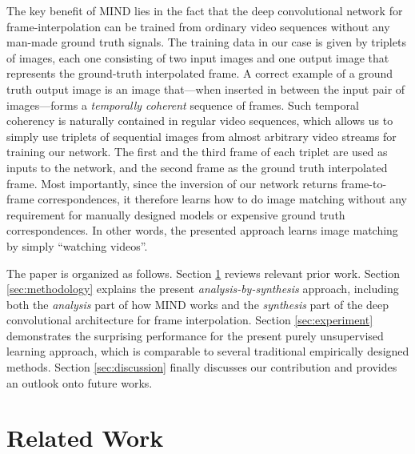 \documentclass[runningheads]{llncs}
\begin{document}
  The key benefit of MIND lies in the fact that the deep convolutional network for frame-interpolation can be trained from ordinary video sequences without any man-made ground truth signals. The training data in our case is given by triplets of images, each one consisting of two input images and one output image that represents the ground-truth interpolated frame. A correct example of a ground truth output image is an image that---when inserted in between the input pair of images---forms a \textit{temporally coherent} sequence of frames. Such temporal coherency is naturally contained in regular video sequences, which allows us to simply use triplets of sequential images from almost arbitrary video streams for training our network. The first and the third frame of each triplet are used as inputs to the network, and the second frame as the ground truth interpolated frame. Most importantly, since the inversion of our network returns frame-to-frame correspondences, it therefore learns how to do image matching without any requirement for manually designed models or expensive ground truth correspondences. In other words, the presented approach learns image matching by simply ``watching videos''.
  
	The paper is organized as follows. Section \ref{sec:related_work} reviews relevant prior work. Section \ref{sec:methodology} explains the present \textit{analysis-by-synthesis} approach, including both the \textit{analysis} part of how MIND works and the \textit{synthesis} part of the deep convolutional architecture for frame interpolation. Section \ref{sec:experiment} demonstrates the surprising performance for the present purely unsupervised learning approach, which is comparable to several traditional empirically designed methods. Section \ref{sec:discussion} finally discusses our contribution and provides an outlook onto future works. 

\section{Related Work} 
\label{sec:related_work}
		
\end{document}
